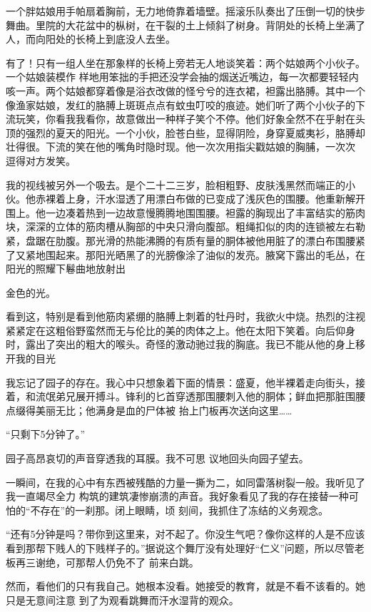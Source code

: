 \documentclass{article}
\begin{document}
一个胖姑娘用手帕扇着胸前，无力地倚靠着墙壁。摇滚乐队奏出了压倒一切的快步舞曲。里院的大花盆中的枞树，在干裂的土上倾斜了树身。背阴处的长椅上坐满了人，而向阳处的长椅上到底没人去坐。

有了！只有一组人坐在那象样的长椅上旁若无人地谈笑着：两个姑娘两个小伙子。一个姑娘装模作
\newpage
样地用笨拙的手把还没学会抽的烟送近嘴边，每一次都要轻轻内咳一声。两个姑娘都穿着像是浴衣改做的怪兮兮的连衣裙，袒露出胳膊。其中一个像渔家姑娘，发红的胳膊上斑斑点点有蚊虫叮咬的痕迹。她们听了两个小伙子的下流玩笑，你看我我看你，故意做出一种样子笑个不停。他们好象全然不在乎射在头顶的强烈的夏天的阳光。一个小伙，脸苍白些，显得阴险，身穿夏威夷衫，胳膊却壮得很。下流的笑在他的嘴角时隐时现。他一次次用指尖戳姑娘的胸脯，一次次
逗得对方发笑。 

我的视线被另外一个吸去。是个二十二三岁，脸相粗野、皮肤浅黑然而端正的小伙。他赤裸着上身，汗水湿透了用漂白布做的已变成了浅灰色的围腰。他重新解开围上。他一边凑着热到一边故意慢腾腾地围围腰。袒露的胸现出了丰富结实的筋肉块，深深的立体的筋肉槽从胸部的中央只滑向腹部。粗绳扣似的肉的连锁被左右勒紧，盘踞在肋腹。那光滑的热能沸腾的有质有量的胴体被他用脏了的漂白布围腰紧了又紧地围起来。那阳光晒黑了的光膀像涂了油似的发亮。腋窝下露出的毛丛，在阳光的照耀下鬈曲地放射出
\newpage

金色的光。 

看到这，特别是看到他筋肉紧绷的胳膊上刺着的牡丹时，我欲火中烧。热烈的注视紧紧定在这粗俗野蛮然而无与伦比的美的肉体之上。他在太阳下笑着。向后仰身时，露出了突出的粗大的喉头。奇怪的激动驰过我的胸底。我已不能从他的身上移开我的目光

我忘记了园子的存在。我心中只想象着下面的情景：盛夏，他半裸着走向街头，接着，和流氓弟兄展开搏斗。锋利的匕首穿透那围腰刺入他的胴体；鲜血把那脏围腰点缀得美丽无比；他满身是血的尸体被
抬上门板再次送向这里…… 


“只剩下5分钟了。” 

园子高昂哀切的声音穿透我的耳膜。我不可思
议地回头向园子望去。 

一瞬间，在我的心中有东西被残酷的力量一撕为二，如同雷落树裂一般。我听见了我一直竭尽全力
\newpage
构筑的建筑凄惨崩溃的声音。我好象看见了我的存在接替一种可怕的“不存在”的一刹那。闭上眼睛，顷
刻间，我抓住了冻结的义务观念。 

“还有5分钟是吗？带你到这里来，对不起了。你没生气吧？像你这样的人是不应该看到那帮下贱人的下贱样子的。”据说这个舞厅没有处理好“仁义”问题，所以尽管老板再三谢绝，可那帮人仍免不了
前来白跳。 

然而，看他们的只有我自己。她根本没看。她接受的教育，就是不看不该看的。她只是无意间注意
到了为观看跳舞而汗水湿背的观众。 
\end{document}
